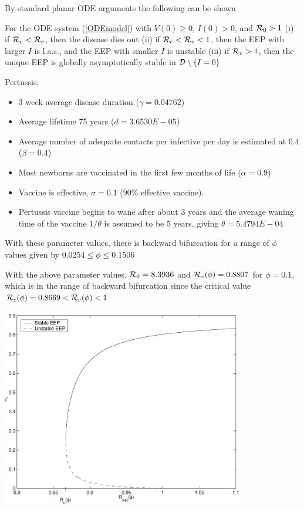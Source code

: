 \documentclass[aspectratio=169]{beamer}\usepackage[]{graphicx}\usepackage[]{xcolor}
\begin{document}
\begin{frame}
By standard planar ODE arguments the following can be shown
\vfill
\begin{theorem}
For the ODE system (\ref{ODEmodel}) with $V(0)\geq 0$, $I(0)>0$, and $\mathcal{R}_0>1$
\vskip0.3cm
(i) if $\mathcal{R}_v<\mathcal{R}_c$, then the disease dies out
\vskip0.3cm
(ii) if $\mathcal{R}_c<\mathcal{R}_v<1$, then the EEP with larger $I$ is l.a.s., and the EEP with smaller $I$ is unstable
\vskip0.3cm
(iii) if $\mathcal{R}_v>1$, then the unique EEP is globally asymptotically stable in $\mathcal{D}\setminus\{I=0\}$
\label{th:odecase}
\end{theorem}
\end{frame}

\begin{frame}
Pertussis:
\begin{itemize}
\item 3 week average disease duration ($\gamma=0.04762$)
\item Average lifetime 75 years ($d=3.6530E-05$)
\item Average number of adequate contacts per infective per day is estimated at 0.4 ($\beta=0.4$)
\item Most newborns are vaccinated in the first few months of life
 ($\alpha=0.9$)
\item  Vaccine is effective, $\sigma=0.1$ (90\% effective vaccine).
\item Pertussis vaccine begins to wane after about 3 years
 and the average waning time of the vaccine
 $1/\theta$ is assumed to be 5 years, giving $\theta=5.4794E-04$
\end{itemize}
\vfill
With these parameter values, there is backward
bifurcation for a range of $\phi$ values given by $0.0254\leq\phi\leq0.1506$
\end{frame}

\begin{frame}
With the above parameter values, $\mathcal{R}_0=8.3936$ and
$\mathcal{R}_v(\phi)=0.8807$ for
$\phi=0.1$, which is in the range of backward bifurcation since the
critical value $\mathcal{R}_c(\phi)=0.8669<\mathcal{R}_v(\phi)<1$
\vfill
\begin{center}
   \includegraphics[width=0.8\textwidth]{FIGS/SIV_ode_bif_phi}
\end{center}
\end{frame}
\end{document}
